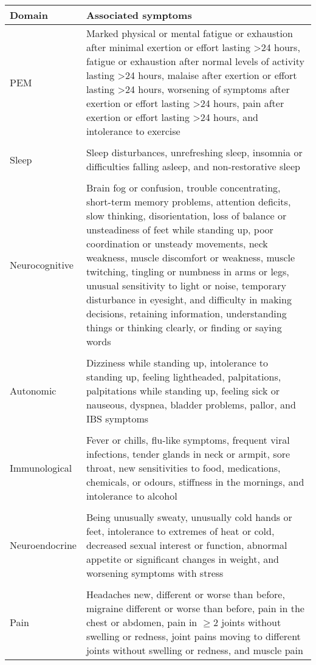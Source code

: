 \begin{tabular}{p{} p{}}
\toprule
Domain & Associated symptoms \\
\midrule
PEM & Marked physical or mental fatigue or exhaustion after minimal exertion or effort lasting >24 hours, fatigue or exhaustion after normal levels of activity lasting >24 hours, malaise after exertion or effort lasting >24 hours, worsening of symptoms after exertion or effort lasting >24 hours, pain after exertion or effort lasting >24 hours, and intolerance to exercise \\
 & \\
Sleep & Sleep disturbances, unrefreshing sleep, insomnia or difficulties falling asleep, and non-restorative sleep \\
 & \\
Neurocognitive & Brain fog or confusion, trouble concentrating, short-term memory problems, attention deficits, slow thinking, disorientation, loss of balance or unsteadiness of feet while standing up, poor coordination or unsteady movements, neck weakness, muscle discomfort or weakness, muscle twitching, tingling or numbness in arms or legs, unusual sensitivity to light or noise, temporary disturbance in eyesight, and difficulty in making decisions, retaining information, understanding things or thinking clearly, or finding or saying words \\
 & \\
Autonomic & Dizziness while standing up, intolerance to standing up, feeling lightheaded, palpitations, palpitations while standing up, feeling sick or nauseous, dyspnea, bladder problems, pallor, and IBS symptoms \\
 & \\
Immunological & Fever or chills, flu-like symptoms, frequent viral infections, tender glands in neck or armpit, sore throat, new sensitivities to food, medications, chemicals, or odours, stiffness in the mornings, and intolerance to alcohol \\
 & \\
Neuroendocrine & Being unusually sweaty, unusually cold hands or feet, intolerance to extremes of heat or cold, decreased sexual interest or function, abnormal appetite or significant changes in weight, and worsening symptoms with stress \\
 & \\
Pain & Headaches new, different or worse than before, migraine different or worse than before, pain in the chest or abdomen, pain in ${\geq}$2 joints without swelling or redness, joint pains moving to different joints without swelling or redness, and muscle pain \\
\bottomrule
\end{tabular}